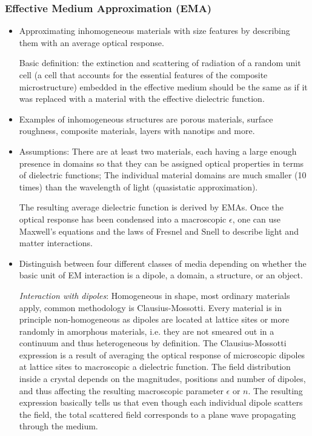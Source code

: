 \subsubsection{Effective Medium Approximation (EMA)}

\begin{itemize}
    \item Approximating inhomogeneous materials with size features by describing them with an average optical response. 
    
    Basic definition: the extinction and scattering of radiation of a random unit cell (a cell that accounts for the essential features of the composite microstructure) embedded in the effective medium should be the same as if it was replaced with a material with the effective dielectric function.
    
    \item Examples of inhomogeneous structures are porous materials, surface roughness, composite materials, layers with nanotips and more.
    
    \item Assumptions: There are at least two materials, each having a large enough presence in domains so that they can be assigned optical properties in terms of dielectric functions;
    The individual material domains are much smaller (10 times) than the wavelength of light (quasistatic approximation).
    
    The resulting average dielectric function is derived by EMAs. Once the optical response has been condensed into a macroscopic $\epsilon$, one can use Maxwell's equations and the laws of Fresnel and Snell to describe light and matter interactions.
    
    \item Distinguish between four different classes of media depending on whether the basic unit of EM interaction is a dipole, a domain, a structure, or an object.
    
    \emph{Interaction with dipoles}: Homogeneous in shape, most ordinary materials apply, common methodology is Clausius-Mossotti. Every material is in principle non-homogeneous as dipoles are located at lattice sites or more randomly in amorphous materials, i.e. they are not smeared out in a continuum and thus heterogeneous by definition. The Clausius-Mossotti expression is a result of averaging the optical response of microscopic dipoles at lattice sites to macroscopic a dielectric function. The field distribution inside a crystal depends on the magnitudes, positions and number of dipoles, and thus affecting the resulting macroscopic parameter $\epsilon$ or $n$. The resulting expression basically tells us that even though each individual dipole scatters the field, the total scattered field corresponds to a plane wave propagating through the medium.
    

\end{itemize}
